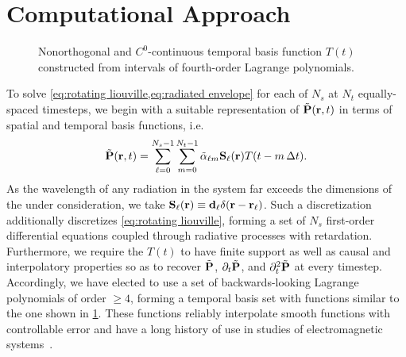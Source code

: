 \section{\label{section:computational approach}Computational Approach}

\begin{figure}
  
  \caption{\label{fig:interpolation basis} Nonorthogonal and $C^0$-continuous temporal basis function $T(t)$ constructed from intervals of fourth-order Lagrange polynomials.}
\end{figure}
To solve \cref{eq:rotating liouville,eq:radiated envelope} for each of $N_s$ \qds{} at $N_t$ equally-spaced timesteps, we begin with a suitable representation of $\tilde{\vb{P}}(\vb{r}, t)$ in terms of spatial and temporal basis functions, i.e.~
\begin{equation}
  \tilde{\vb{P}}(\vb{r}, t) = \sum_{\ell=0}^{N_s - 1} \sum_{m = 0}^{N_t - 1} \tilde{\alpha}_{\ell m} \vb{S}_\ell(\vb{r}) T(t - m \, \Delta t).
  \label{eq:basis function representation}
\end{equation}
As the wavelength of any radiation in the system far exceeds the dimensions of the \qds{} under consideration, we take $\vb{S}_\ell(\vb{r}) \equiv \vb{d}_\ell \delta(\vb{r} - \vb{r}_\ell)$.
Such a discretization additionally discretizes \cref{eq:rotating liouville}, forming a set of $N_s$ first-order differential equations coupled through radiative processes with retardation.
Furthermore, we require the $T(t)$ to have finite support as well as causal and interpolatory properties so as to recover $\tilde{\vb{P}}$, $\partial_t \tilde{\vb{P}}$, and $\partial^2_t \tilde{\vb{P}}$ at every timestep.
Accordingly, we have elected to use a set of backwards-looking Lagrange polynomials of order $\ge 4$, forming a temporal basis set with functions similar to the one shown in \cref{fig:interpolation basis}.
These functions  reliably interpolate smooth functions with controllable error and have a long history of use in studies of electromagnetic systems~\textcolor{red}{\cite{SHANKER,SHANKER,SHANKER}}.

